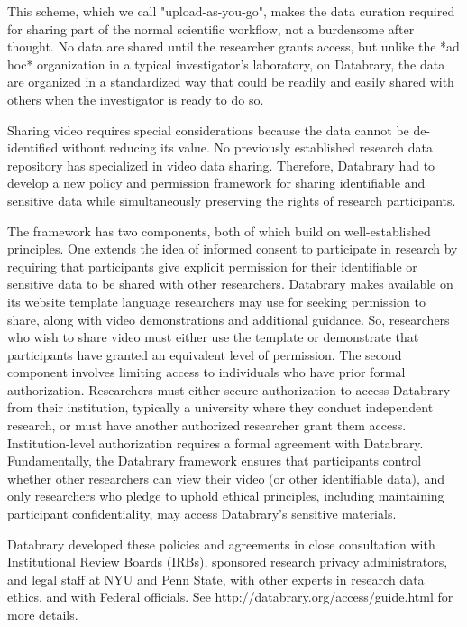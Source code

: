 \documentclass{sig-alternate}
\begin{document}
This scheme, which we call "upload-as-you-go", makes the data curation
required for sharing part of the normal scientific workflow, not a
burdensome after thought. No data are shared until the researcher grants
access, but unlike the *ad hoc* organization in a typical investigator's
laboratory, on Databrary, the data are organized in a standardized way
that could be readily and easily shared with others when the
investigator is ready to do so.

Sharing video requires special considerations because the data cannot be
de-identified without reducing its value. No previously established
research data repository has specialized in video data sharing.
Therefore, Databrary had to develop a new policy and permission
framework for sharing identifiable and sensitive data while
simultaneously preserving the rights of research participants.

The framework has two components, both of which build on
well-established principles. One extends the idea of informed consent to
participate in research by requiring that participants give explicit
permission for their identifiable or sensitive data to be shared with
other researchers. Databrary makes available on its website template
language researchers may use for seeking permission to share, along with
video demonstrations and additional guidance. So, researchers who wish
to share video must either use the template or demonstrate that
participants have granted an equivalent level of permission. The second
component involves limiting access to individuals who have prior formal
authorization. Researchers must either secure authorization to access
Databrary from their institution, typically a university where they
conduct independent research, or must have another authorized researcher
grant them access. Institution-level authorization requires a formal
agreement with Databrary. Fundamentally, the Databrary framework ensures
that participants control whether other researchers can view their video
(or other identifiable data), and only researchers who pledge to uphold
ethical principles, including maintaining participant confidentiality,
may access Databrary's sensitive materials.

Databrary developed these policies and agreements in close consultation
with Institutional Review Boards (IRBs), sponsored research privacy
administrators, and legal staff at NYU and Penn State, with other
experts in research data ethics, and with Federal officials. See
http://databrary.org/access/guide.html for more details.
\end{document}
